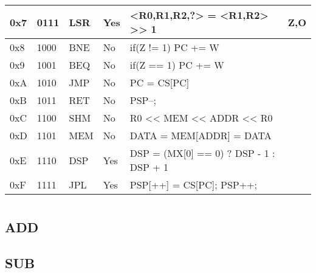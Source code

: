 \documentclass[a4paper]{article}
\begin{document}
\begin{table}[]
\begin{tabular}{|l|l|l|l|l|l|}
        0x7                 &   0111            &   LSR                 &   Yes                 &   <R0,R1,R2,?> = <R1,R2> >> 1             &   Z,O                     \\ \hline  
        0x8                 &   1000            &   BNE                 &   No                  &   if(Z != 1) PC += W                      &                           \\ \hline  
        0x9                 &   1001            &   BEQ                 &   No                  &   if(Z == 1) PC += W                      &                           \\ \hline  
        0xA                 &   1010            &   JMP                 &   No                  &   PC = CS[PC]                             &                           \\ \hline  
        0xB                 &   1011            &   RET                 &   No                  &   PSP--;                             &                           \\ \hline  
        0xC                 &   1100            &   SHM                 &   No                  &   R0 << MEM << ADDR << R0                 &                           \\ \hline  
        0xD                 &   1101            &   MEM                 &   No                  &   DATA = MEM[ADDR] = DATA                 &                           \\ \hline  
        0xE                 &   1110            &   DSP                 &   Yes                 &   DSP = (MX[0] == 0) ? DSP - 1 : DSP + 1     &                           \\ \hline  
        0xF                 &   1111            &   JPL                 &   Yes                 &   PSP[++] = CS[PC]; PSP++;                     &                      \\ \hline  
    \end{tabular}
\end{table}


\section{}

\subsection{ADD}

\subsection{SUB}
\end{document}
